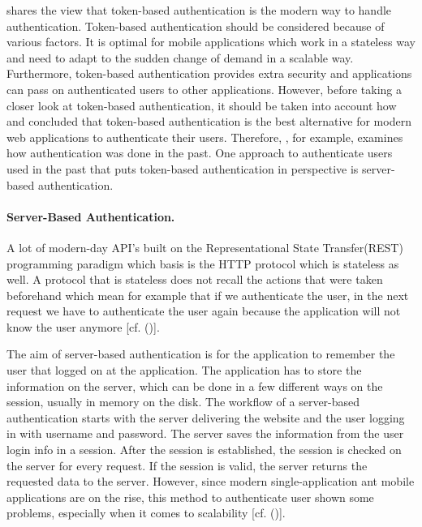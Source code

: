 {\cite{Serilleja:2015:Scothio} shares the view that token-based authentication is the modern way to handle authentication. Token-based authentication should be considered because of various factors. It is optimal for mobile applications which work in a stateless way and need to adapt to the sudden change of demand in a scalable way. Furthermore, token-based authentication provides extra security and applications can pass on authenticated users to other applications. However, before taking a closer look at token-based authentication, it should be taken into account how \cite{Serilleja:2015:Scothio} and \cite{Tkalec:2015} concluded that token-based authentication is the best alternative for modern web applications to authenticate their users. Therefore, \cite{Serilleja:2015:Scothio}, for example, examines how authentication was done in the past. One approach to authenticate users used in the past that puts token-based authentication in perspective is server-based authentication. 

\paragraph{Server-Based Authentication.}
A lot of modern-day API’s built on the Representational State Transfer(REST) programming paradigm which basis is the HTTP protocol which is stateless as well. A protocol that is stateless does not recall the actions that were taken beforehand which mean for example that if we authenticate the user, in the next request we have to authenticate the user again because the application will not know the user anymore [cf. (\cite{Serilleja:2015:Scothio})]. 

The aim of server-based authentication is for the application to remember the user that logged on at the application. The application has to store the information on the server, which can be done in a few different ways on the session, usually in memory on the disk. The workflow of a server-based authentication starts with the server delivering the website and the user logging in with username and password. The server saves the information from the user login info in a session. After the session is established, the session is checked on the server for every request. If the session is valid, the server returns the requested data to the server. However, since modern single-application ant mobile applications are on the rise, this method to authenticate user shown some problems, especially when it comes to scalability [cf. (\cite{Serilleja:2015:Scothio})]. 

}
